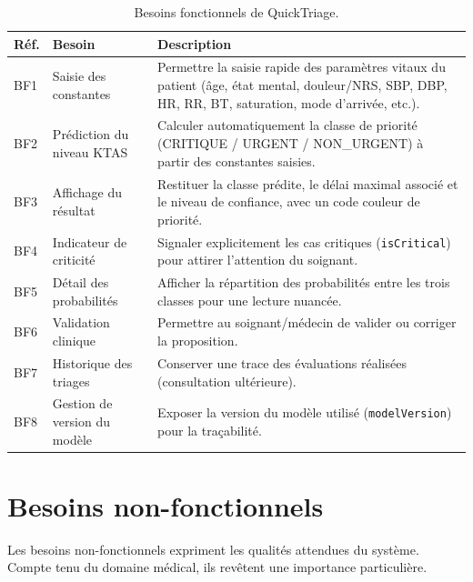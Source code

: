 \begin{table}[h]
\centering
\renewcommand{\arraystretch}{1.3}
\begin{tabular}{p{1.6cm} p{4.2cm} p{8cm}}
\toprule
\textbf{Réf.} & \textbf{Besoin} & \textbf{Description} \\
\midrule
BF1 & Saisie des constantes & Permettre la saisie rapide des paramètres vitaux du patient
(âge, état mental, douleur/NRS, SBP, DBP, HR, RR, BT, saturation, mode d'arrivée, etc.). \\
BF2 & Prédiction du niveau KTAS & Calculer automatiquement la classe de priorité
(CRITIQUE / URGENT / NON\_URGENT) à partir des constantes saisies. \\
BF3 & Affichage du résultat & Restituer la classe prédite, le délai maximal associé et le
niveau de confiance, avec un code couleur de priorité. \\
BF4 & Indicateur de criticité & Signaler explicitement les cas critiques
(\texttt{isCritical}) pour attirer l'attention du soignant. \\
BF5 & Détail des probabilités & Afficher la répartition des probabilités entre les trois
classes pour une lecture nuancée. \\
BF6 & Validation clinique & Permettre au soignant/médecin de valider ou corriger la
proposition. \\
BF7 & Historique des triages & Conserver une trace des évaluations réalisées (consultation
ultérieure). \\
BF8 & Gestion de version du modèle & Exposer la version du modèle utilisé
(\texttt{modelVersion}) pour la traçabilité. \\
\bottomrule
\end{tabular}
\caption{Besoins fonctionnels de QuickTriage.}
\label{tab:bf}
\end{table}

\section{Besoins non-fonctionnels}
Les besoins non-fonctionnels expriment les qualités attendues du système. Compte tenu du
domaine médical, ils revêtent une importance particulière.

